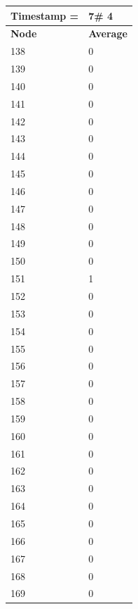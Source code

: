 \begin{tabular}{|l||l|}
\hline
\textbf{Timestamp =} & \textbf{7}\# 4\\\hline
	\textbf{Node} & \textbf{Average} \\ \hline
\hline
	138 & 0 \\ \hline
	139 & 0 \\ \hline
	140 & 0 \\ \hline
	141 & 0 \\ \hline
	142 & 0 \\ \hline
	143 & 0 \\ \hline
	144 & 0 \\ \hline
	145 & 0 \\ \hline
	146 & 0 \\ \hline
	147 & 0 \\ \hline
	148 & 0 \\ \hline
	149 & 0 \\ \hline
	150 & 0 \\ \hline
	151 & 1 \\ \hline
	152 & 0 \\ \hline
	153 & 0 \\ \hline
	154 & 0 \\ \hline
	155 & 0 \\ \hline
	156 & 0 \\ \hline
	157 & 0 \\ \hline
	158 & 0 \\ \hline
	159 & 0 \\ \hline
	160 & 0 \\ \hline
	161 & 0 \\ \hline
	162 & 0 \\ \hline
	163 & 0 \\ \hline
	164 & 0 \\ \hline
	165 & 0 \\ \hline
	166 & 0 \\ \hline
	167 & 0 \\ \hline
	168 & 0 \\ \hline
	169 & 0 \\ \hline
\end{tabular}

